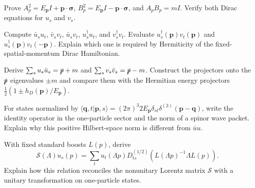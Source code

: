\documentclass[11pt]{article}
\begin{document}
\begin{parts}
\item Prove \(A_p^2=E_{\bm p}I+\bm p\cdot\bm\sigma\),
\(B_p^2=E_{\bm p}I-\bm p\cdot\bm\sigma\), and \(A_pB_p=mI\).
Verify both Dirac equations for \(u_s\) and \(v_s\).
\item Compute \(\bar u_su_t\), \(\bar v_sv_t\), \(\bar u_sv_t\),
\(u_s^\dagger u_t\), and \(v_s^\dagger v_t\).
Evaluate \(u_s^\dagger(\bm p)v_t(\bm p)\) and
\(u_s^\dagger(\bm p)v_t(-\bm p)\). Explain which one is required by
Hermiticity of the fixed-spatial-momentum Dirac Hamiltonian.
\item Derive \(\sum_su_s\bar u_s=\slashed p+m\) and
\(\sum_sv_s\bar v_s=\slashed p-m\). Construct the projectors onto the
\(\slashed p\) eigenvalues \(\pm m\) and compare them with the Hermitian
energy projectors \(\frac12(1\pm h_D(\bm p)/E_{\bm p})\).
\item For states normalized by
\(\langle\bm q,t|\bm p,s\rangle=(2\pi)^3 2E_{\bm p}
\delta_{st}\delta^{(3)}(\bm p-\bm q)\), write the identity operator in the
one-particle sector and the norm of a spinor wave packet.
Explain why this positive Hilbert-space norm is different from
\(\bar u u\).
\item With fixed standard boosts \(L(p)\), derive
\[
 \mathcal S(\Lambda)u_s(p)=\sum_tu_t(\Lambda p)
 D_{ts}^{(1/2)}\!\left(L(\Lambda p)^{-1}\Lambda L(p)\right).
\]
Explain how this relation reconciles the nonunitary Lorentz matrix
\(\mathcal S\) with a unitary transformation on one-particle states.
\end{parts}
\end{document}

